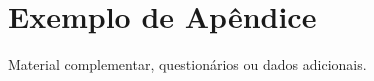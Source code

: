 \section{Exemplo de Apêndice}\label{sec:apendiceA}

Material complementar, questionários ou dados adicionais.
